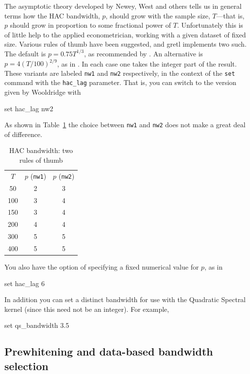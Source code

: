 The asymptotic theory developed by Newey, West and others tells us in
general terms how the HAC bandwidth, $p$, should grow with the sample
size, $T$---that is, $p$ should grow in proportion to some
fractional power of $T$.  Unfortunately this is of little help to the
applied econometrician, working with a given dataset of fixed size.
Various rules of thumb have been suggested, and gretl implements
two such.  The default is $p = 0.75 T^{1/3}$, as recommended by
\cite{stock-watson03}.  An alternative is $p = 4(T/100)^{2/9}$, as in
\cite{wooldridge-intro}.  In each case one takes the integer part of the
result.  These variants are labeled \texttt{nw1} and \texttt{nw2}
respectively, in the context of the \texttt{set} command with the
\verb|hac_lag| parameter.  That is, you can switch to the version
given by Wooldridge with
%
\begin{code}
set hac_lag nw2
\end{code}
%
As shown in Table~\ref{tab:haclag} the choice between \texttt{nw1} and
\texttt{nw2} does not make a great deal of difference.

\begin{table}[htbp]
  \centering
  \begin{tabular}{ccc}
    $T$ & $p$ (\texttt{nw1}) & $p$ (\texttt{nw2}) \\[4pt]
50& 	2& 	3 \\
100& 	3& 	4 \\
150& 	3& 	4 \\
200& 	4& 	4 \\
300& 	5& 	5 \\
400& 	5& 	5 \\
  \end{tabular}
\caption{HAC bandwidth: two rules of thumb}
\label{tab:haclag}
\end{table}

You also have the option of specifying a fixed numerical value for
$p$, as in
%
\begin{code}
set hac_lag 6
\end{code}
%
In addition you can set a distinct bandwidth for use with the
Quadratic Spectral kernel (since this need not be an integer).  For
example,
%
\begin{code}
set qs_bandwidth 3.5
\end{code}

\subsection{Prewhitening and data-based bandwidth selection}
\label{sec:hac-prewhiten}

